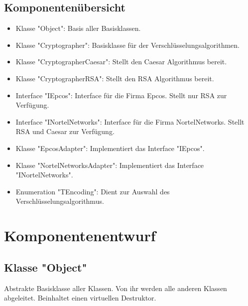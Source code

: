 \documentclass[12pt,a4paper]{article}
\begin{document}
\subsection {Komponentenübersicht}
\begin {itemize} 
	\item Klasse "Object":
	\newline
	Basis aller Basisklassen.
	
	\item Klasse "Cryptographer":
	\newline
	Basisklasse für der Verschlüsselungsalgorithmen.
	
	\item Klasse "CryptographerCaesar":
	\newline
	Stellt den Caesar Algorithmus bereit.
	
	\item Klasse "CryptographerRSA":
	\newline	
	Stellt den RSA Algorithmus bereit.
	
	\item Interface "IEpcos":
	\newline
	Interface für die Firma Epcos. Stellt nur RSA zur Verfügung.
	
	\item Interface "INortelNetworks":
	\newline
	Interface für die Firma NortelNetworks. Stellt RSA und Caesar zur Verfügung.
	
	\item Klasse "EpcosAdapter":
	\newline
	Implementiert das Interface "IEpcos".
	
	\item Klasse "NortelNetworksAdapter":
	\newline
	Implementiert das Interface "INortelNetworks".
	
	\item Enumeration "TEncoding":
	\newline
	Dient zur Auswahl des Verschlüsselungsalgorithmus.
	
	
\end {itemize}

\newpage
\section {Komponentenentwurf}
\subsection {Klasse "Object"}
Abstrakte Basisklasse aller Klassen. Von ihr werden alle anderen Klassen abgeleitet. Beinhaltet einen virtuellen Destruktor.
\end{document}
